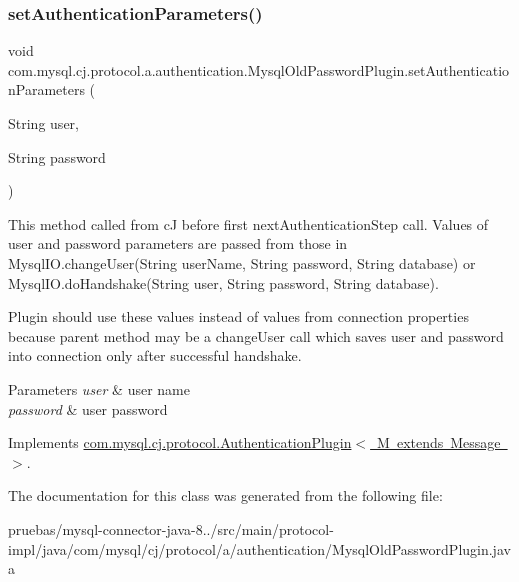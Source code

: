 \subsubsection{\texorpdfstring{set\+Authentication\+Parameters()}{setAuthenticationParameters()}}
{\footnotesize\ttfamily void com.\+mysql.\+cj.\+protocol.\+a.\+authentication.\+Mysql\+Old\+Password\+Plugin.\+set\+Authentication\+Parameters (\begin{DoxyParamCaption}\item[{String}]{user,  }\item[{String}]{password }\end{DoxyParamCaption})}

This method called from cJ before first next\+Authentication\+Step call. Values of user and password parameters are passed from those in Mysql\+I\+O.\+change\+User(String user\+Name, String password, String database) or Mysql\+I\+O.\+do\+Handshake(String user, String password, String database).

Plugin should use these values instead of values from connection properties because parent method may be a change\+User call which saves user and password into connection only after successful handshake.


\begin{DoxyParams}{Parameters}
{\em user} & user name \\
\hline
{\em password} & user password \\
\hline
\end{DoxyParams}


Implements \mbox{\hyperlink{interfacecom_1_1mysql_1_1cj_1_1protocol_1_1_authentication_plugin_a22458c3992dbf9f91560d75a99e234d3}{com.\+mysql.\+cj.\+protocol.\+Authentication\+Plugin$<$ M extends Message $>$}}.



The documentation for this class was generated from the following file\+:\begin{DoxyCompactItemize}
\item 
pruebas/mysql-\/connector-\/java-\/8../src/main/protocol-\/impl/java/com/mysql/cj/protocol/a/authentication/Mysql\+Old\+Password\+Plugin.\+java\end{DoxyCompactItemize}
